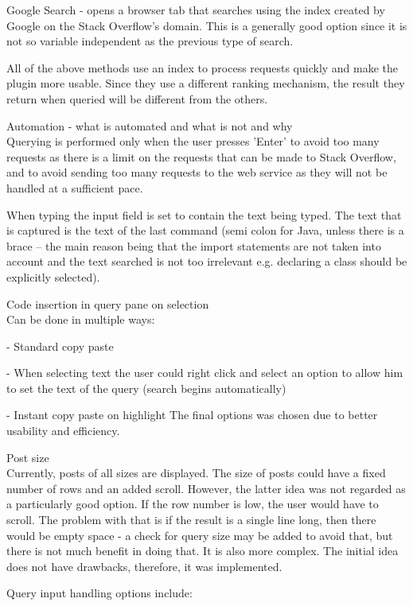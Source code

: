 \documentclass{l4proj}
\begin{document}
Google Search - opens a browser tab that searches using the index created by Google on the Stack Overflow's domain. This is a generally good option since it is not so variable independent as the previous type of search.

All of the above methods use an index to process requests quickly and make the plugin more usable. Since they use a different ranking mechanism, the result they return when queried will be different from the others.

Automation - what is automated and what is not and why\\

Querying is performed only when the user presses 'Enter' to avoid too many requests as there is a limit on the requests that can be made to Stack Overflow, and to avoid sending too many requests to the web service as they will not be handled at a sufficient pace.

When typing the input field is set to contain the text being typed. The text
that is captured is the text of the last command (semi colon for Java, unless 
there is a brace – the main reason being that the import statements are not
taken into account and the text searched is not too irrelevant e.g. declaring a
class should be explicitly selected).

Code insertion in query pane on selection\\
Can be done in multiple ways:

- Standard copy paste

- When selecting text the user could right click and select an option to allow him to set the text of the query (search begins automatically) 

- Instant copy paste on highlight
The final options was chosen due to better usability and efficiency.

Post size\\
Currently, posts of all sizes are displayed. The size of posts could have a fixed number of rows and an added scroll. However, the latter idea was not regarded as a particularly good option. If the row number is low, the user would have to scroll. The problem with that is if the result is a single line long, then there would be empty space - a check for query size may be added to avoid that, but there is not much benefit in doing that. It is also more complex. The initial idea does not have drawbacks, therefore, it was implemented.

Query input handling options include:
\end{document}
